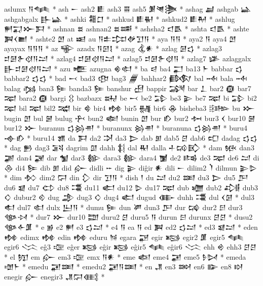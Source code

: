  aslumx  𒀀𒈝 *   
 ash  𒀸   
 ash2  𒀾   
 ash3  𒐋   
 ash5  𒋠𒇴𒋦 *   
 ashag  𒃷   
 ashgab  𒀿   
 ashgabgalx  𒃲𒀿 *   
 ashki  𒍤𒆸 *   
 ashkud  𒀾𒈽 *   
 ashkud2  𒀾𒈹 *   
 ashlug  𒂍𒍑𒁍𒁕 *   
 ashnan  𒊺   
 ashnan2  𒊺𒌁 *   
 ashsha2  𒃰𒋺 *   
 ashta  𒃰𒋺 *   
 ashte  𒀉𒌋𒆤 *   
 ashte2  𒆹   
 at  𒀜   
 au  𒀀𒉺𒄐𒉻𒋛𒀀 *   
 aya  𒀀𒀀 *   
 aya2  𒀀   
 aya4  𒆹   
 ayayax  𒀀𒀀𒀀 *   
 az  𒊍   
 azadx  𒀀𒇉𒋙 *   
 azag  𒆬𒀭 *   
 azlag  𒌆𒌓 *   
 azlag3  𒄑𒌆𒉿𒋼𒀀𒁺 *   
 azlag4  𒄑𒌆𒋼𒀀𒁺 *   
 azlag5  𒄑𒌆𒉿𒋼𒀀 *   
 azlag7  𒈐   
 azlaggalx  𒃲𒄑𒌆𒋼𒀀𒁺 *   
 azu  𒍬   
 azugna  𒄯𒊕 *   
 ba  𒁀   
 ba4  𒂷   
 ba13  𒈨   
 babbar  𒌓   
 babbar2  𒌓𒌓 *   
 bad  𒁁   
 bad3  𒂦   
 bag3  𒁂   
 bahhar2  𒁃   
 bal  𒁄   
 bala  𒁄   
 balag  𒁆   
 ban3  𒌉   
 banda3  𒌉   
 banshur  𒍎   
 bappir  𒋋   
 bar  𒁇   
 bar2  𒁈   
 bar7  𒉈   
 bara2  𒁈   
 bargi  𒌐   
 bazbazx  𒊻   
 be  𒁁   
 be2  𒁉   
 be3  𒉌   
 be7  𒉈   
 bi  𒁉   
 bi2  𒉈   
 bil  𒉈   
 bil2  𒉋   
 bir  𒄵   
 bir4  𒂔   
 bir5  𒉆   
 bir6  𒊶   
 bisheba3  𒄡   
 bu  𒁍   
 bugin  𒆹   
 bul  𒇧   
 bulug  𒁑   
 bun2  𒅮   
 bunin  𒆹   
 bur  𒁓   
 bur2  𒁔   
 bur3  𒌋   
 bur10  𒇧   
 bur12  𒁍   
 buranun  𒌓𒄒𒉣 *   
 buranunx  𒄒𒉣 *   
 buranuna  𒌓𒄒𒉣 *   
 buru4  𒉢𒁓 *   
 buru14  𒂙   
 da  𒁕   
 da2  𒋫   
 da3  𒆕   
 dab  𒁳   
 dab5  𒆪   
 dab6  𒍏   
 dadag  𒌓𒌓 *   
 dag  𒁖   
 dag3  𒍴   
 dagrim  𒇑   
 dahh  𒈭   
 dal  𒊑   
 dalla  𒈦𒄘𒃼 *   
 dam  𒁮   
 dan3  𒃩   
 dan4  𒃋   
 dar  𒁯   
 dar3  𒁰   
 dara3  𒁰   
 dara4  𒁱   
 de2  𒌤   
 de3  𒉈   
 de6  𒁺   
 di  𒁲   
 di4  𒌉   
 dib  𒁳   
 did  𒅎   
 didli  𒐀   
 dig  𒉌   
 diĝir  𒀭   
 dili  𒀸   
 dilim2  𒇺   
 dilmun  𒉌𒌇 *   
 dim  𒁴   
 dim2  𒁶   
 din  𒁷   
 dir  𒋛𒀀 *   
 dish  𒁹   
 du  𒁺   
 du2  𒌅   
 du3  𒆕   
 du5  𒂅   
 du6  𒇯   
 du7  𒌌   
 du8  𒂃   
 du11  𒅗   
 du12  𒌇   
 du17  𒉈   
 dub  𒁾   
 dub2  𒂀   
 dub3  𒄭   
 dubur2  𒄶   
 dug  𒂁   
 dug3  𒄭   
 dug4  𒅗   
 dugud  𒂂   
 duhh  𒂃   
 dul  𒌋𒌆 *   
 dul3  𒊨   
 dul7  𒊕   
 dulx  𒌨𒀀    *   
 dumu  𒌉   
 dun  𒂄   
 dun3  𒂅   
 dur  𒄙   
 dur2  𒂉   
 dur3  𒀲𒀴 *   
 dur7  𒁍   
 dur10  𒊿   
 duru2  𒆪   
 duru5  𒀀   
 durun  𒂉   
 durunx  𒆪𒆪 *   
 dusu2  𒀲𒅆𒂠 *   
 e  𒂊   
 e2  𒂍   
 e3  𒌓𒁺 *   
 e4  𒀀   
 ea  𒀀   
 ed  𒀉   
 ed2  𒌓𒁺 *   
 ed3  𒇯𒁺 *   
 eden  𒂔   
 edimx  𒂔   
 edin  𒂔   
 eduru  𒀁   
 egara  𒃌   
 egir  𒂕   
 egir2  𒂠   
 egir5  𒈝   
 egir6  𒈱   
 eĝ3  𒉘   
 eĝer  𒂕   
 eĝir  𒂕   
 eĝir5  𒈝   
 eĝir6  𒈱   
 ehh  𒄴   
 ehh3  𒆪𒆪 *   
 el  𒂖   
 em  𒅎   
 em3  𒉘   
 emx  𒀀𒀭 *   
 eme  𒅴   
 eme4  𒂼   
 eme5  𒊩𒄸 *   
 emeda  𒌝𒈨 *   
 emedu  𒂼𒌅 *   
 emedu2  𒂼𒀀𒌅 *   
 en  𒂗   
 en3  𒇷   
 en6  𒅔   
 en8  𒊭   
 enegir  𒅎   
 enegir3  𒂗𒁶𒍼 *   

